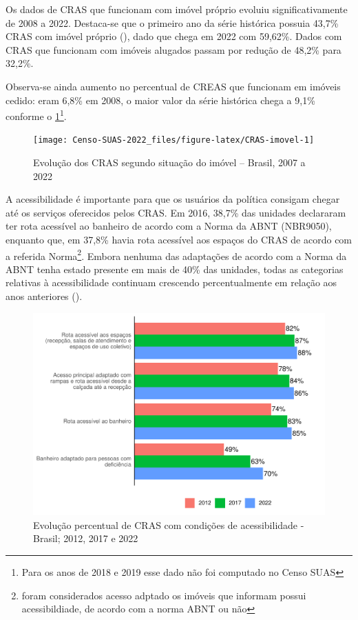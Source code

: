 \documentclass[
  brazilian]{report}
\begin{document}
Os dados de CRAS que funcionam com imóvel próprio evoluiu
significativamente de 2008 a 2022. Destaca-se que o primeiro ano da
série histórica possuia 43,7\% CRAS com imóvel próprio
(), dado que chega em 2022 com 59,62\%. Dados com
CRAS que funcionam com imóveis alugados passam por redução de 48,2\%
para 32,2\%.

Observa-se ainda aumento no percentual de CREAS que funcionam em imóveis
cedido: eram 6,8\% em 2008, o maior valor da série histórica chega a
9,1\% conforme o
\cref{fig:CRAS-imovel}\footnote{Para os anos de 2018 e 2019 esse dado não foi computado no Censo SUAS}.

\begin{figure}
\texttt{[image: Censo-SUAS-2022\_files/figure-latex/CRAS-imovel-1]} \caption[Evolução dos CRAS segundo situação do imóvel – Brasil, 2007 a 2022]{Evolução dos CRAS segundo situação do imóvel – Brasil, 2007 a 2022}\label{fig:CRAS-imovel}
\end{figure}

A acessibilidade é importante para que os usuários da política consigam
chegar até os serviços oferecidos pelos CRAS. Em 2016, 38,7\% das
unidades declararam ter rota acessível ao banheiro de acordo com a Norma
da ABNT (NBR9050), enquanto que, em 37,8\% havia rota acessível aos
espaços do CRAS de acordo com a referida
Norma\footnote{foram considerados acesso adptado os imóveis que informam possui acessibildiade, de acordo com a norma ABNT ou não}.
Embora nenhuma das adaptações de acordo com a Norma da ABNT tenha estado
presente em mais de 40\% das unidades, todas as categorias relativas à
acessibilidade continuam crescendo percentualmente em relação aos anos
anteriores ().

\begin{figure}
\includegraphics{Censo-SUAS-2022_files/figure-latex/CRAS-acessibilidade-1} \caption[Evolução percentual de CRAS com condições de acessibilidade - Brasil]{Evolução percentual de CRAS com condições de acessibilidade - Brasil; 2012, 2017 e 2022}\label{fig:CRAS-acessibilidade}
\end{figure}
\end{document}
